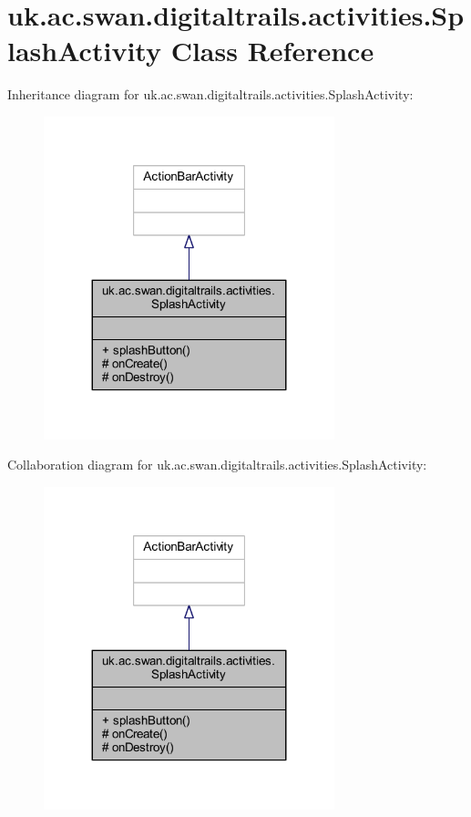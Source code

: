 \hypertarget{classuk_1_1ac_1_1swan_1_1digitaltrails_1_1activities_1_1_splash_activity}{\section{uk.\+ac.\+swan.\+digitaltrails.\+activities.\+Splash\+Activity Class Reference}
\label{classuk_1_1ac_1_1swan_1_1digitaltrails_1_1activities_1_1_splash_activity}
}


Inheritance diagram for uk.\+ac.\+swan.\+digitaltrails.\+activities.\+Splash\+Activity\+:
\nopagebreak
\begin{figure}[H]
\begin{center}
\leavevmode
\includegraphics[width=239pt]{classuk_1_1ac_1_1swan_1_1digitaltrails_1_1activities_1_1_splash_activity__inherit__graph}
\end{center}
\end{figure}


Collaboration diagram for uk.\+ac.\+swan.\+digitaltrails.\+activities.\+Splash\+Activity\+:
\nopagebreak
\begin{figure}[H]
\begin{center}
\leavevmode
\includegraphics[width=239pt]{classuk_1_1ac_1_1swan_1_1digitaltrails_1_1activities_1_1_splash_activity__coll__graph}
\end{center}
\end{figure}
